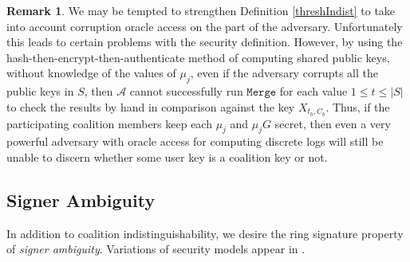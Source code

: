 \documentclass{mrl}
\theoremstyle{definition}
\newtheorem{disc}[theorem]{Remark}
\begin{document}
 \begin{disc}
 We may be tempted to strengthen Definition \ref{threshIndist} to take into account corruption oracle access on the part of the adversary. Unfortunately this leads to certain problems with the security definition.   However, by using the hash-then-encrypt-then-authenticate method of computing shared public keys, without knowledge of the values of $\mu_j$, even if the adversary corrupts all the public keys in $S$, then $\mathcal{A}$ cannot successfully run $\texttt{Merge}$ for each value $1 \leq t \leq \left|S\right|$ to check the results by hand in comparison against the key $X_{t_b,C_b}$.  Thus, if the participating coalition members keep each $\mu_j$ and $\mu_j G$ secret, then even a very powerful adversary with oracle access for computing discrete logs will still be unable to discern whether some user key is a coalition key or not.
 \end{disc}


\subsection{Signer Ambiguity}

In addition to coalition indistinguishability, we desire the ring signature property of \textit{signer ambiguity}. Variations of security models appear in \cite{bender2006ring}. 
\end{document}
